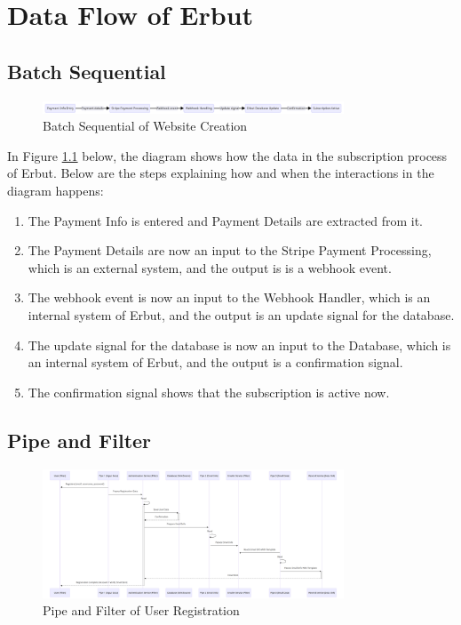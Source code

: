 \documentclass[a4paper]{report}
\begin{document}
\chapter{Data Flow of Erbut}

\section{Batch Sequential}

\begin{figure}[h!]
    \centering
    \includegraphics[width=0.8\textwidth]{images/data-flow/user-subscription-batch-sequential.png}
    \caption{Batch Sequential of Website Creation}
    \label{fig:batch-sequential-user-subscription}
\end{figure}

In Figure \ref{fig:batch-sequential-user-subscription} below, the diagram shows how the data in the subscription process of Erbut. Below are the steps explaining how and when the interactions in the diagram happens:

\begin{enumerate}
    \item The Payment Info is entered and Payment Details are extracted from it.
    \item The Payment Details are now an input to the Stripe Payment Processing, which is an external system, and the output is is a webhook event.
    \item The webhook event is now an input to the Webhook Handler, which is an internal system of Erbut, and the output is an update signal for the database.
    \item The update signal for the database is now an input to the Database, which is an internal system of Erbut, and the output is a confirmation signal.
    \item The confirmation signal shows that the subscription is active now.
\end{enumerate}

\section{Pipe and Filter}

\begin{figure}[h!]
    \centering
    \includegraphics[width=0.8\textwidth]{images/data-flow/registration-pipe-and-filter.png}
    \caption{Pipe and Filter of User Registration}
    \label{fig:pip-and-filter-user-registration}
\end{figure}
\end{document}
